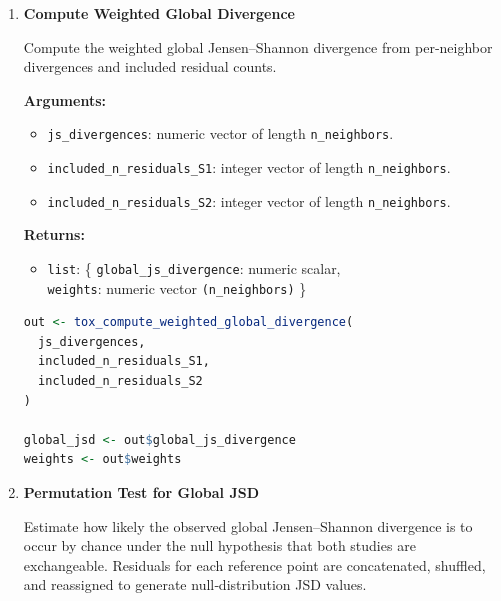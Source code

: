 \begin{enumerate}
        \textbf{Returns:}
        \begin{itemize}
            \item \lstinline!numeric!: vector of length \lstinline!n_neighbors! containing JSD values.
        \end{itemize}

        \begin{lstlisting}[language=R, caption={Per‑Neighbor JSD}]
jsd <- tox_compute_divergence_per_reference_point(
  pmf_S1,
  pmf_S2
)
        \end{lstlisting}

    \item \textbf{Compute Weighted Global Divergence}

        Compute the weighted global Jensen–Shannon divergence from per‑neighbor divergences and included residual counts.

        \textbf{Arguments:}
        \begin{itemize}
            \item \lstinline!js_divergences!: numeric vector of length \lstinline!n_neighbors!.
            \item \lstinline!included_n_residuals_S1!: integer vector of length \lstinline!n_neighbors!.
            \item \lstinline!included_n_residuals_S2!: integer vector of length \lstinline!n_neighbors!.
        \end{itemize}

        \textbf{Returns:}
        \begin{itemize}
            \item \lstinline!list!: \{
                \lstinline!global_js_divergence!: numeric scalar,\\
                \lstinline!weights!: numeric vector \lstinline!(n_neighbors)!
            \}
        \end{itemize}

        \begin{lstlisting}[language=R, caption={Weighted Global JSD}]
out <- tox_compute_weighted_global_divergence(
  js_divergences,
  included_n_residuals_S1,
  included_n_residuals_S2
)

global_jsd <- out$global_js_divergence
weights <- out$weights
        \end{lstlisting}

    \item \textbf{Permutation Test for Global JSD}

        Estimate how likely the observed global Jensen–Shannon divergence is to occur by chance under the null hypothesis that both studies are exchangeable.  
        Residuals for each reference point are concatenated, shuffled, and reassigned to generate null‑distribution JSD values.


\end{enumerate}
